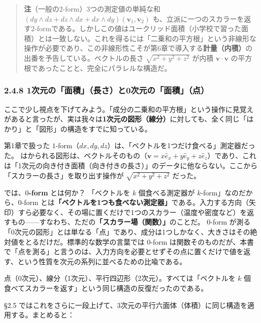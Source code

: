 \documentclass[a4paper,12pt,openany]{book}
\begin{document}
\begin{quote}
\textbf{注}（一般の\(2\)-form）3つの測定値の単純な和
\((dy \wedge dz + dz \wedge dx + dx \wedge dy)(\mathbf{v}_1,\mathbf{v}_2)\)
も、立派に一つのスカラーを返す\(2\)-formである。しかしこの値はユークリッド面積（小学校で習った面積）とは一致しない。これを得るには「二乗和の平方根」という非線形な操作が必要であり、この非線形性こそが第6章で導入する\textbf{計量（内積）}の出番を予告している。ベクトルの長さ
\(\sqrt{x^2+y^2+z^2}\) が内積 \(\mathbf{v}\cdot\mathbf{v}\)
の平方根であったことと、完全にパラレルな構造だ。
\end{quote}

\hypertarget{ux6b21ux5143ux306eux9762ux7a4dux9577ux3055ux30680ux6b21ux5143ux306eux9762ux7a4dux70b9}{%
\subsubsection{2.4.8
1次元の「面積」（長さ）と0次元の「面積」（点）}\label{ux6b21ux5143ux306eux9762ux7a4dux9577ux3055ux30680ux6b21ux5143ux306eux9762ux7a4dux70b9}}

ここで少し視点を下げてみよう。「成分の二乗和の平方根」という操作に見覚えがあると言ったが、実は我々は\textbf{1次元の図形（線分）}に対しても、全く同じ「はかり」と「図形」の構造をすでに知っている。

第1章で扱った
\(1\)-form（\(dx, dy, dz\)）は、「ベクトルを1つだけ食べる」測定器だった。
はかられる図形は、ベクトルそのもの（\(\mathbf{v} = x\hat{e}_x + y\hat{e}_y + z\hat{e}_z\)）であり、これは「1次元の向き付き面積（向き付きの長さ）」のデータに他ならない。ここから「スカラーの長さ」を取り出す操作が
\(\sqrt{x^2+y^2+z^2}\) だった。

では、\(0\)\textbf{-form} とは何か？ 「ベクトルを \(k\) 個食べる測定器が
\(k\)-form」なのだから、\(0\)-form
とは\textbf{「ベクトルを1つも食べない測定器」}である。入力する方向（矢印）すら必要なく、その場に置くだけで1つのスカラー（温度や密度など）を返すもの——すなわち、ただの\textbf{「スカラー場（関数）」}のことだ。
\(0\)-form
が測る「0次元の図形」とは単なる「点」であり、成分は1つしかなく、大きさはその絶対値をとるだけだ。標準的な数学の言葉では
\(0\)-form
は関数そのものだが、本書で「点を測る」と言うのは、入力方向を必要とせずその点に置くだけで値を返す、という性質を次元の系列に並べるための比喩である。

点（0次元）、線分（1次元）、平行四辺形（2次元）。すべては「ベクトルを
\(k\) 個食べてスカラーを返す」という同じ構造の反復だったのである。

§2.5
ではこれをさらに一段上げて、3次元の平行六面体（体積）に同じ構造を適用する。まとめると：
\end{document}
